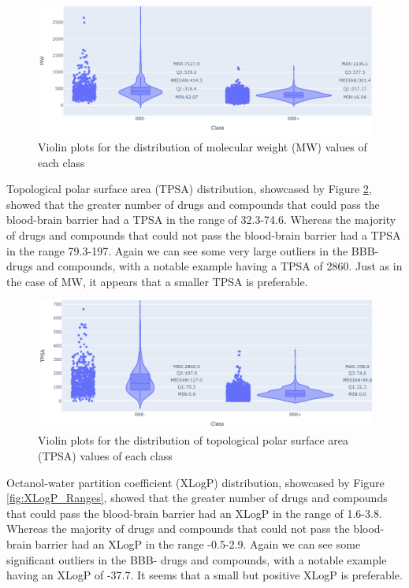 \begin{figure}[!ht]
    \centering
    \includegraphics[width=0.9\linewidth]{images/MW Ranges.pdf}    

    \caption{Violin plots for the distribution of molecular weight (MW) values of each class}

    \label{fig:MW_Ranges} 
\end{figure}

Topological polar surface area (TPSA) distribution, showcased by Figure \ref{fig:TPSA_Ranges}, showed that the greater number of drugs and compounds that could pass the blood-brain barrier had a TPSA in the range of 32.3-74.6. Whereas the majority of drugs and compounds that could not pass the blood-brain barrier had a TPSA in the range 79.3-197. Again we can see some very large outliers in the BBB- drugs and compounds, with a notable example having a TPSA of 2860. Just as in the case of MW, it appears that a smaller TPSA is preferable.

\begin{figure}[!ht]
    \centering
    \includegraphics[width=0.9\linewidth]{images/TPSA Ranges.pdf}    

    \caption{Violin plots for the distribution of topological polar surface area (TPSA) values of each class}

    \label{fig:TPSA_Ranges} 
\end{figure}

Octanol-water partition coefficient (XLogP) distribution, showcased by Figure \ref{fig:XLogP_Ranges}, showed that the greater number of drugs and compounds that could pass the blood-brain barrier had an XLogP in the range of 1.6-3.8. Whereas the majority of drugs and compounds that could not pass the blood-brain barrier had an XLogP in the range -0.5-2.9. Again we can see some significant outliers in the BBB- drugs and compounds, with a notable example having an XLogP of -37.7. It seems that a small but positive XLogP is preferable.

